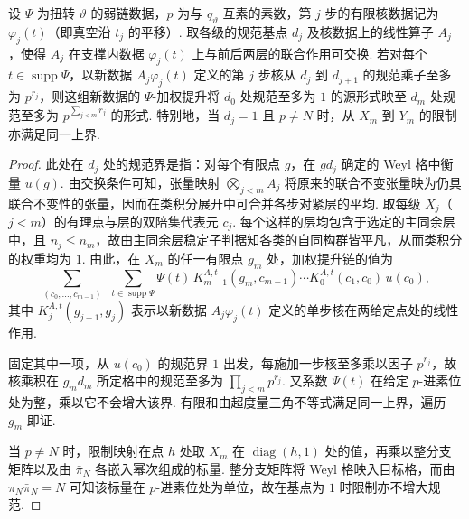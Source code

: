 \begin{lemma}[各步规范沿提升链相乘]
\label{lem:a-weak-chain-gauge}
\emitthmsource
设 $\Psi$ 为扭转 $\vartheta$ 的弱链数据，$p$ 为与 $q_\vartheta$ 互素的素数，第 $j$ 步的有限核数据记为 $\varphi_j(t)$（即真空沿 $t_j$ 的平移）. 取各级的规范基点 $d_j$ 及核数据上的线性算子 $A_j$，使得 $A_j$ 在支撑内数据 $\varphi_j(t)$ 上与前后两层的联合作用可交换. 若对每个 $t\in\operatorname{supp}\Psi$，以新数据 $A_j\varphi_j(t)$ 定义的第 $j$ 步核从 $d_j$ 到 $d_{j+1}$ 的规范乘子至多为 $p^{r_j}$，则这组新数据的 $\Psi$-加权提升将 $d_0$ 处规范至多为 $1$ 的源形式映至 $d_m$ 处规范至多为 $p^{\sum_{j<m}r_j}$ 的形式. 特别地，当 $d_j=1$ 且 $p\ne N$ 时，从 $X_m$ 到 $Y_m$ 的限制亦满足同一上界.
\end{lemma}
\begin{proof}
此处在 $d_j$ 处的规范界是指：对每个有限点 $g$，在 $gd_j$ 确定的 Weyl 格中衡量 $u(g)$. 由交换条件可知，张量映射 $\bigotimes_{j<m}A_j$ 将原来的联合不变张量映为仍具联合不变性的张量，因而在类积分展开中可合并各步对紧层的平均. 取每级 $X_j$（$j<m$）的有理点与层的双陪集代表元 $c_j$. 每个这样的层均包含于选定的主同余层中，且 $n_j\le n_m$，故由主同余层稳定子判据知各类的自同构群皆平凡，从而类积分的权重均为 $1$. 由此，在 $X_m$ 的任一有限点 $g_m$ 处，加权提升链的值为
\[
 \sum_{(c_0,\ldots,c_{m-1})}\ \
 \sum_{t\in\operatorname{supp}\Psi}
 \Psi(t)\,K^{A,t}_{m-1}(g_m,c_{m-1})\cdots
 K^{A,t}_0(c_1,c_0)\,u(c_0),
\]
其中 $K^{A,t}_j(g_{j+1},g_j)$ 表示以新数据 $A_j\varphi_j(t)$ 定义的单步核在两给定点处的线性作用.

固定其中一项，从 $u(c_0)$ 的规范界 $1$ 出发，每施加一步核至多乘以因子 $p^{r_j}$，故核乘积在 $g_md_m$ 所定格中的规范至多为 $\prod_{j<m}p^{r_j}$. 又系数 $\Psi(t)$ 在给定 $p$-进素位处为整，乘以它不会增大该界. 有限和由超度量三角不等式满足同一上界，遍历 $g_m$ 即证.

当 $p\ne N$ 时，限制映射在点 $h$ 处取 $X_m$ 在 $\operatorname{diag}(h,1)$ 处的值，再乘以整分支矩阵以及由 $\bar\pi_N$ 各嵌入幂次组成的标量. 整分支矩阵将 Weyl 格映入目标格，而由 $\pi_N\bar\pi_N=N$ 可知该标量在 $p$-进素位处为单位，故在基点为 $1$ 时限制亦不增大规范.
\end{proof}

